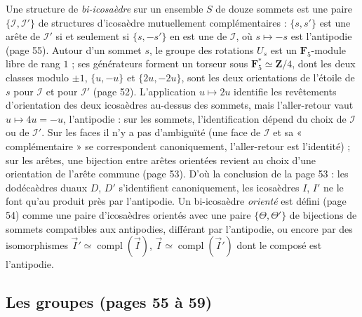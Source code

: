 \documentclass[11pt,a4paper]{article}
\begin{document}
Une structure de \emph{bi-icosaèdre} sur un ensemble $S$ de douze sommets est
une paire $\{\mathcal{I}, \mathcal{I}'\}$ de structures d'icosaèdre
mutuellement complémentaires : $\{s, s'\}$ est une arête de $\mathcal{I}'$ si et
seulement si $\{s, -s'\}$ en est une de $\mathcal{I}$, où $s \mapsto -s$ est
l'antipodie (page 55). Autour d'un sommet $s$, le groupe des rotations $U_s$ est
un $\mathbf{F}_5$-module libre de rang $1$ ; ses générateurs forment un torseur
sous $\mathbf{F}_5^{*} \simeq \mathbf{Z}/4$, dont les deux classes modulo $\pm
1$, $\{u, -u\}$ et $\{2u, -2u\}$, sont les deux orientations de l'étoile de $s$
pour $\mathcal{I}$ et pour $\mathcal{I}'$ (page 52). L'application $u \mapsto
2u$ identifie les revêtements d'orientation des deux icosaèdres au-dessus des
sommets, mais l'aller-retour vaut $u \mapsto 4u = -u$, l'antipodie : sur les
sommets, l'identification dépend du choix de $\mathcal{I}$ ou de $\mathcal{I}'$.
Sur les faces il n'y a pas d'ambiguïté (une face de $\mathcal{I}$ et sa
« complémentaire » se correspondent canoniquement, l'aller-retour est
l'identité) ; sur les arêtes, une bijection entre arêtes orientées revient au
choix d'une orientation de l'arête commune (page 53). D'où la conclusion de la
page 53 : les dodécaèdres duaux $D$, $D'$ s'identifient canoniquement, les
icosaèdres $I$, $I'$ ne le font qu'au produit près par l'antipodie. Un
bi-icosaèdre \emph{orienté} est défini (page 54) comme une paire d'icosaèdres
orientés avec une paire $\{\Theta, \Theta'\}$ de bijections de sommets
compatibles aux antipodies, différant par l'antipodie, ou encore par des
isomorphismes $\vec{I}' \simeq \operatorname{compl}(\vec{I})$, $\vec{I}
\simeq \operatorname{compl}(\vec{I}')$ dont le composé est l'antipodie.

\subsection*{Les groupes (pages 55 à 59)}
\end{document}
